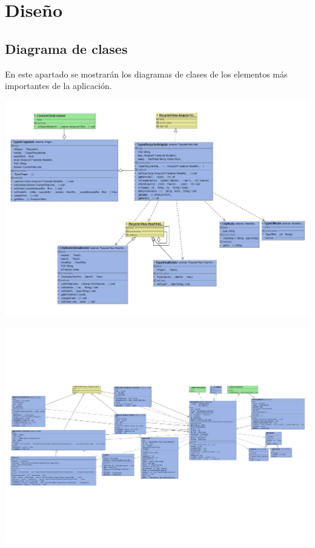 \chapter{Diseño}
\section[Diagrama de clases]{Diagrama de clases}
En este apartado se mostrarán los diagramas de clases de los elementos más importantes de la aplicación.
\thispagestyle{empty}
{%
	\label{fig:fragment_diagram}
	\centering
	\includegraphics[scale=.95,angle=90]{imagenes/fragment_class_diagram.pdf}
	\par
}
\restoregeometry

\thispagestyle{empty}
{%
	\label{fig:main_activity_diagram}
	\centering
	\includegraphics[scale=.95,angle=90]{imagenes/main_activity_class_diagram.pdf}
	\par
}
\restoregeometry


